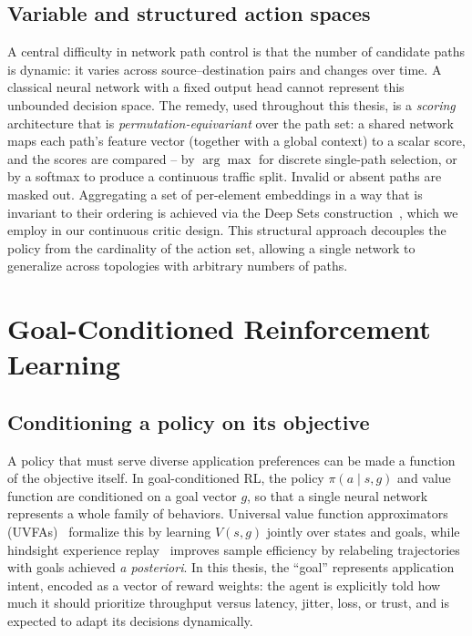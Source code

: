 \subsection{Variable and structured action spaces}
\label{sec:background:variable}
A central difficulty in network path control is that the number of candidate paths is dynamic: it varies across
source--destination pairs and changes over time. A classical neural network with a fixed output head 
cannot represent this unbounded decision space. The remedy, used throughout this thesis, is a 
\emph{scoring} architecture that is \emph{permutation-equivariant} over the path set: a shared network 
maps each path's feature vector (together with a global context) to a scalar score, and the scores are 
compared -- by $\arg\max$ for discrete single-path selection, or by a softmax to produce a continuous traffic split. 
Invalid or absent paths are masked out. Aggregating a set of per-element embeddings in a way that is
invariant to their ordering is achieved via the Deep Sets construction~\cite{Zaheer2017}, which we employ in 
our continuous critic design. This structural approach decouples the policy from the cardinality of 
the action set, allowing a single network to generalize across topologies with arbitrary numbers of paths.

\section{Goal-Conditioned Reinforcement Learning}
\label{sec:background:intent}

\subsection{Conditioning a policy on its objective}
A policy that must serve diverse application preferences can be made a function of the objective itself. In
goal-conditioned RL, the policy $\pi(a \mid s, g)$ and value function are conditioned on a goal vector $g$,
so that a single neural network represents a whole family of behaviors. Universal value function approximators
(UVFAs)~\cite{Schaul2015} formalize this by learning $V(s, g)$ jointly over states and goals, while hindsight 
experience replay~\cite{Andrychowicz2017} improves sample efficiency by relabeling trajectories with goals 
achieved \emph{a posteriori}. In this thesis, the ``goal'' represents application intent,
encoded as a vector of reward weights: the agent is explicitly told how much it should prioritize throughput
versus latency, jitter, loss, or trust, and is expected to adapt its decisions dynamically.

